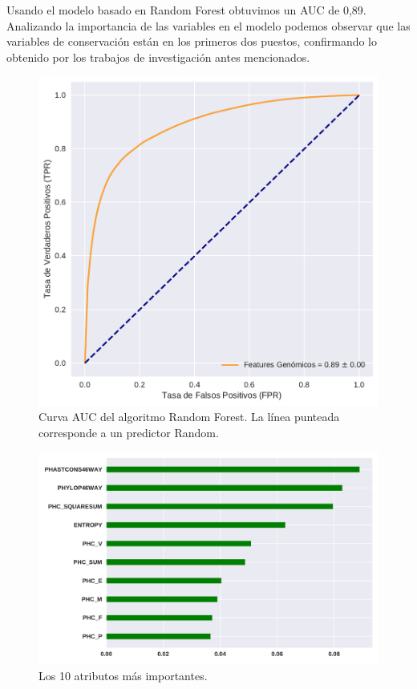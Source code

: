 Usando el modelo basado en Random Forest obtuvimos un AUC de 0,89. Analizando la importancia de las variables en el modelo podemos observar que las variables de conservación están en los primeros dos puestos, confirmando lo obtenido por los trabajos de investigación antes mencionados. 

\begin{figure}[H]
    \centering
    \includegraphics[scale=0.73]{documents/latex/figures/3/auc_2.pdf}
    \caption{Curva AUC del algoritmo Random Forest. La línea punteada corresponde a un predictor Random.}
    \label{fig:auc_2}
\end{figure}

\begin{figure}[H]
    \centering
    \includegraphics[scale=0.73]{documents/latex/figures/3/importance_2.pdf}
    \caption{Los 10 atributos más importantes.}
    \label{fig:importance_2}
\end{figure}

